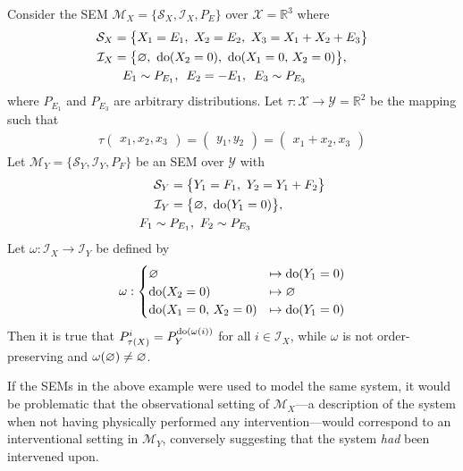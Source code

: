 \begin{example}\label{example:wrong1}
Consider the SEM $\mathcal{M}_X=\{\mathcal{S}_X , \mathcal{I}_X, P_E\}$ over $\mathcal{X}=\mathbb{R}^3$ where
%
\begin{align*}
\mathcal{S}_X = \big\{ & X_1 = E_1,\ X_2 = E_2,\ X_3 = X_1 + X_2 + E_3 \big\} \\
%
\mathcal{I}_X = \big\{ & \nulli,\ \doop(X_2=0),\ \doop(X_1=0,\, X_2=0)\big\}, \\
%
E_1 & \sim P_{E_1},\ \,  E_2 = - E_1, \  \, E_3 \sim P_{E_3}
\end{align*}
%
where $P_{E_1}$ and $P_{E_3}$ are arbitrary distributions.
Let ${\tau:\mathcal{X}\to\mathcal{Y}=\mathbb{R}^2}$ be the mapping such that
\begin{align*}
\tau\begin{pmatrix} x_1, x_2, x_3 \end{pmatrix}
= \begin{pmatrix} y_1, y_2\end{pmatrix}
= \begin{pmatrix} x_1 + x_2, x_3\end{pmatrix}
\end{align*}
%
Let $\mathcal{M}_Y =\{\mathcal{S}_Y , \mathcal{I}_Y, P_F\}$ be an SEM over $\mathcal{Y}$ with
%
\begin{align*}
\mathcal{S}_Y = \big\{ & Y_1 = F_1,\ Y_2 = Y_1 + F_2 \big\} \\
%
\mathcal{I}_Y = \big\{ & \nulli,\ \doop(Y_1=0) \big\}, \\
%
F_1 \sim P_{E_1},&  \  \, F_2 \sim P_{E_3}
\end{align*}
%
Let ${\omega:\mathcal{I}_X \to \mathcal{I}_Y}$ be defined by
%
\begin{align*}
\omega: \begin{cases}
\varnothing &\mapsto \operatorname{do}(Y_1=0) \\
\operatorname{do}(X_2=0) &\mapsto \varnothing \\
\operatorname{do}(X_1=0,\, X_2=0) &\mapsto \operatorname{do}(Y_1=0) \\
\end{cases}
\end{align*}
%
Then it is true that ${P_{\tau(X)}^{i} = P_Y^{\operatorname{do}(\omega(i))}}$ for all  ${i \in \mathcal{I}_X }$, while $\omega$ is not order-preserving and $\omega(\varnothing)\not = \varnothing$.
\end{example}

If the SEMs in the above example were used to model the same system, it would be problematic that the observational setting of $\mathcal{M}_X$---a description of the system when not having physically performed any intervention---would correspond to an interventional setting in $\mathcal{M}_Y$, conversely suggesting that the system \emph{had} been intervened upon.

